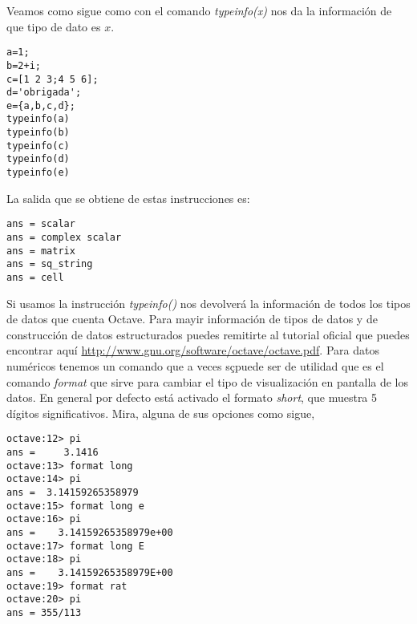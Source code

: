 Veamos como sigue como con el comando \textit{typeinfo(x)} nos da la
información de que tipo de dato es $x$.
\begin{octavebox}
  \begin{verbatim}
a=1;
b=2+i;
c=[1 2 3;4 5 6];
d='obrigada';
e={a,b,c,d};
typeinfo(a)
typeinfo(b)
typeinfo(c)
typeinfo(d)
typeinfo(e)
\end{verbatim}
\end{octavebox}
La salida que se obtiene de estas instrucciones es:
\begin{octavebox}
  \begin{verbatim}
ans = scalar
ans = complex scalar
ans = matrix
ans = sq_string
ans = cell
  \end{verbatim}
\end{octavebox}
Si usamos la instrucción \textit{typeinfo()} nos devolverá la
información de todos los tipos de datos que cuenta Octave. Para mayir
información de tipos de datos y de construcción de datos estructurados
puedes remitirte al tutorial oficial que puedes encontrar aquí
\url{http://www.gnu.org/software/octave/octave.pdf}.  Para datos
numéricos tenemos un comando que a veces sçpuede ser de utilidad que
es el comando \textit{format} que sirve para cambiar el tipo de
visualización en pantalla de los datos. En general por defecto está
activado el formato \textit{short}, que muestra 5 dígitos
significativos. Mira, alguna de sus opciones como sigue,
\begin{octavebox}
  \begin{verbatim}
octave:12> pi
ans =     3.1416
octave:13> format long
octave:14> pi
ans =  3.14159265358979
octave:15> format long e
octave:16> pi
ans =    3.14159265358979e+00
octave:17> format long E
octave:18> pi
ans =    3.14159265358979E+00
octave:19> format rat
octave:20> pi
ans = 355/113
  \end{verbatim}
\end{octavebox}
 
